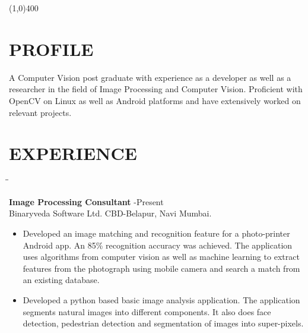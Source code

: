 \documentclass{res}
\begin{document}
 

\address{deven.patel2@gmail.com\\\hspace{6mm}+919819482499}         
\begin{resume}
\begin{center}
\line(1,0){400}
\end{center}
 
\section{PROFILE}
 A Computer Vision post graduate with  experience as a developer as well as a
 researcher in the field of Image Processing and Computer Vision.  Proficient
 with OpenCV  on Linux as well as Android platforms and have extensively worked on
 relevant projects. 
 \section{EXPERIENCE}
 
   \vspace{-0.05in}	
   \begin{tabbing}
   \hspace{2.3in}\= \hspace{2.6in}\= \kill %
   	
    {\bf Image Processing Consultant}     \> -Present\\
        Binaryveda Software Ltd. \>  \>CBD-Belapur, Navi Mumbai. 
   \end{tabbing}      %

    \begin{itemize}
        \item Developed an image matching and recognition feature for a
        photo-printer Android app.  An 85\% recognition accuracy  was achieved. The application uses algorithms from
        computer vision as well as machine learning to extract features from the  photograph using mobile
        camera and 	search a match from an existing database.	
        \item Developed
        a python based basic image analysis application. The application
        segments natural  images into different components. It  also does
        face detection, pedestrian 	detection and segmentation of  images
        into super-pixels.


\end{itemize}
\end{resume}
\end{document}

